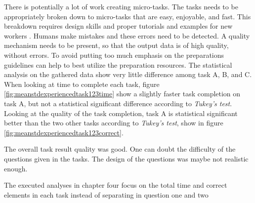 There is potentially a lot of work creating micro-tasks. The tasks needs to be appropriately broken down to micro-tasks that are easy, enjoyable, and fast. This breakdown requires design skills and proper tutorials and examples for new workers \citep{Schulze2012}. Humans make mistakes and these errors need to be detected. A quality mechanism needs to be present, so that the output data is of high quality, without errors. To avoid putting too much emphasis on the preparations guidelines can help to best utilize the preparation resources. The statistical analysis on the gathered data show very little difference among task A, B, and C. When looking at time to complete each task, figure \ref{fig:meanstdexperiencedtask123time} show a slightly faster task completion on task A, but not a statistical significant difference according to \textit{Tukey's test}. Looking at the quality of the task completion, task A is statistical significant better than the two other tasks according to \textit{Tukey's test}, show in figure \ref{fig:meanstdexperiencedtask123correct}. 

The overall task result quality was good. One can doubt the difficulty of the questions given in the tasks. The design of the questions was maybe not realistic enough. 

The executed analyses in chapter four focus on the total time and correct elements in each task instead of separating in question one and two 